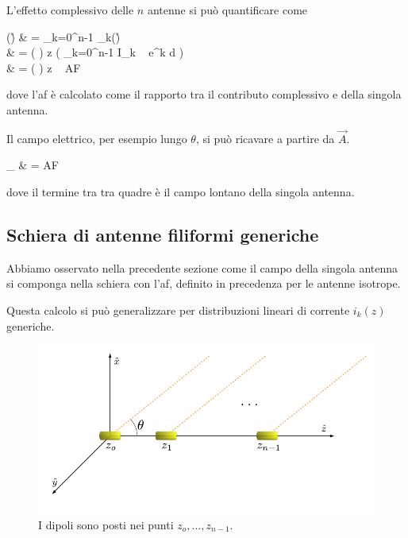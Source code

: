 		L'effetto complessivo delle $n$ antenne si può quantificare come 
		\begin{esp}
			(\r) 
			& = \sum_{k=0}^{n-1} _k(\r) \\
			& = \frac{\mu}{4\pi} 
				\left(  \right) 
				\Delta z
				\left( \sum_{k=0}^{n-1} I_k ~ e^{\jmath k \beta d \cos \theta} \right)  \\
			& = \frac{\mu}{4\pi} 
				\left(  \right) 
				\Delta z ~ AF ~  
		\end{esp}
		dove l'\gls{af} è calcolato come il rapporto tra il contributo complessivo e della singola antenna.
		
		Il campo elettrico, per esempio lungo $\theta$, si può ricavare a partire da $\vec{A}$.
		\begin{esp}
			\vec{E}_\theta
			& = \left[ 
					\jmath \frac{\eta_o}{2\lambda} 
					\left( \frac{e^{-\jmath \beta r}}{r} \right) 
					\Delta z ~ \sin \theta ~ \hat{z} 
				\right] AF
		\end{esp}
		dove il termine tra tra quadre è il campo lontano della singola antenna.
	
	\subsection{Schiera di antenne filiformi generiche}
		Abbiamo osservato nella precedente sezione come il campo della singola antenna si componga nella schiera con l'\gls{af}, definito in precedenza per le antenne isotrope.
		
		Questa calcolo si può generalizzare per distribuzioni lineari di corrente $i_k(z)$ generiche.
		
		\begin{figure}[ht]
			\centering
			\includegraphics{img/schiera_non_isotropa_dipoli.pdf}
			\caption{I dipoli sono posti nei punti $z_o, \ldots, z_{n-1}$.}
			\label{fig:schiera_non_isotropa_dipoli}
		\end{figure}
	
